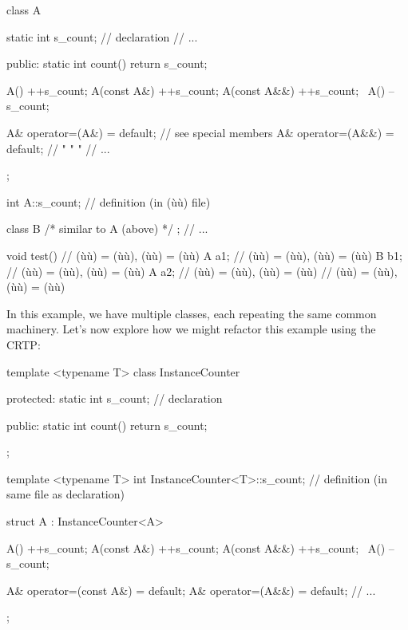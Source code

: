 \begin{emcppslisting}
class A
{
    static int s_count;  // declaration
    // ...

public:
    static int count() { return s_count; }

    A()          { ++s_count; }
    A(const A&)  { ++s_count; }
    A(const A&&) { ++s_count; }
    ~A()         { --s_count; }

    A& operator=(A&)  = default;  // see special members
    A& operator=(A&&) = default;  //  "     "       "
    // ...
};

int A::s_count;  // definition (in (ù{}ù) file)

class B { /* similar to A (above) */ };
// ...

void test()
{          // (ù{}ù) = (ù{}ù), (ù{}ù) = (ù{}ù)
    A a1;  // (ù{}ù) = (ù{}ù), (ù{}ù) = (ù{}ù)
    B b1;  // (ù{}ù) = (ù{}ù), (ù{}ù) = (ù{}ù)
    A a2;  // (ù{}ù) = (ù{}ù), (ù{}ù) = (ù{}ù)
}          // (ù{}ù) = (ù{}ù), (ù{}ù) = (ù{}ù)
\end{emcppslisting}

\noindent In this example, we have multiple classes, each repeating the same
common machinery. Let's now explore how we might refactor this example
using the CRTP:

\begin{emcppslisting}[emcppsbatch=e4]
template <typename T>
class InstanceCounter
{
protected:
    static int s_count;  // declaration

public:
    static int count() { return s_count; }
};

template <typename T>
int InstanceCounter<T>::s_count;  // definition (in same file as declaration)

struct A : InstanceCounter<A>
{
    A()          { ++s_count; }
    A(const A&)  { ++s_count; }
    A(const A&&) { ++s_count; }
    ~A()         { --s_count; }

    A& operator=(const A&)  = default;
    A& operator=(A&&)       = default;
    // ...
};
\end{emcppslisting}

